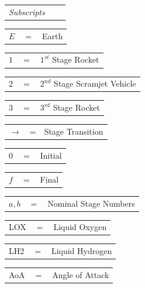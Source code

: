 \documentclass[journal]{new-aiaa}
\begin{document}
	  	\newline  	
	  	\begin{tabular}{p{5.2cm}p{1cm}p{5cm}}


\textit{Subscripts} \\
\end{tabular} 
\newline
\begin{tabular}{p{1.2cm}p{1cm}p{5cm}}
	$E$ & $=$ & Earth\\
	
\end{tabular} 
\begin{tabular}{p{1.2cm}p{1cm}p{5cm}}
$1$ & $=$ & $1^{st}$ Stage Rocket\\
\end{tabular} 
\begin{tabular}{p{1.2cm}p{1cm}p{5cm}}
	$2$ & $=$ & $2^{nd}$ Stage Scramjet Vehicle\\
		\end{tabular} 
		\begin{tabular}{p{1.2cm}p{1cm}p{5cm}}
	$3$ & $=$ & $3^{rd}$ Stage Rocket\\
		\end{tabular} 
		\begin{tabular}{p{1.2cm}p{1cm}p{5cm}}
	$\rightarrow$ & = & Stage Transition\\
		\end{tabular} 
				\begin{tabular}{p{1.2cm}p{1cm}p{5cm}}
					$0$ & $=$ & Initial\\
				\end{tabular} 
		\begin{tabular}{p{1.2cm}p{1cm}p{5cm}}
	$f$ & $=$ & Final\\
\end{tabular} 
\begin{tabular}{p{1.2cm}p{1cm}p{5cm}}
	$a,b$ & $=$ & Nominal Stage Numbers\\
\end{tabular} 
\begin{tabular}{p{1.2cm}p{1cm}p{5cm}}
	LOX & $=$ & Liquid Oxygen\\
\end{tabular} 
\begin{tabular}{p{1.2cm}p{1cm}p{5cm}}
	LH2 & $=$ & Liquid Hydrogen\\
	
\end{tabular} 
\begin{tabular}{p{1.2cm}p{1cm}p{5cm}}
	AoA & $=$ & Angle of Attack\\
	
\end{tabular} 
\end{document}
